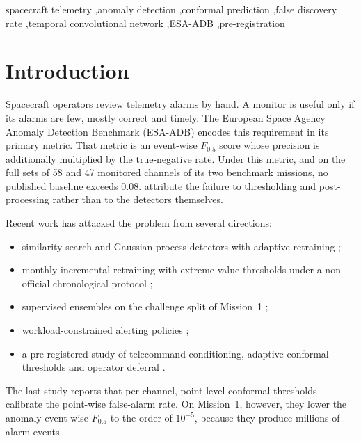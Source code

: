 \documentclass[preprint,12pt,authoryear]{elsarticle}
\begin{document}
\begin{frontmatter}
\begin{abstract}
Exploratory diagnostics trace the deep scorer's failure to a shift between train and test in
its nominal score distribution: nominal test samples exceed the calibration quantile 3--54
times more often than in cross-validation, against 0.8 times for AR(8). Under an
operator-grade metric, how the alarm layer is selected and how stable the scorer's nominal
distribution is matter more than model capacity.
\end{abstract}

\begin{keyword}
spacecraft telemetry \sep anomaly detection \sep conformal prediction \sep false discovery
rate \sep temporal convolutional network \sep ESA-ADB \sep pre-registration
\end{keyword}
\end{frontmatter}

\section{Introduction}\label{sec:intro}

Spacecraft operators review telemetry alarms by hand. A monitor is useful only if its alarms
are few, mostly correct and timely. The European Space Agency Anomaly Detection Benchmark
(ESA-ADB) \citep{kotowski2026esaadb} encodes this requirement in its primary metric. That
metric is an event-wise $F_{0.5}$ score whose precision is additionally multiplied by the
true-negative rate. Under this metric, and on the full sets of 58 and 47 monitored channels
of its two benchmark missions, no published baseline exceeds 0.08.
\citet{kotowski2026esaadb} attribute the failure to thresholding and post-processing rather
than to the detectors themselves.

Recent work has attacked the problem from several directions:
\begin{itemize}
\item similarity-search and Gaussian-process detectors with adaptive retraining
  \citep{brancato2027ast};
\item monthly incremental retraining with extreme-value thresholds under a non-official
  chronological protocol \citep{alcarria2026};
\item supervised ensembles on the challenge split of Mission~1 \citep{allegrini2026};
\item workload-constrained alerting policies \citep{heydari2026};
\item a pre-registered study of telecommand conditioning, adaptive conformal thresholds and
  operator deferral \citep{sahin2026tccad}.
\end{itemize}
The last study reports that per-channel, point-level conformal thresholds calibrate the
point-wise false-alarm rate. On Mission~1, however, they lower the anomaly event-wise
$F_{0.5}$ to the order of $10^{-5}$, because they produce millions of alarm events.
\end{document}
